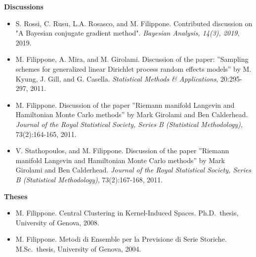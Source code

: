 \textbf{Discussions}\begin{itemize}
\item  S. Rossi, C. Rusu, L.A. Rosasco, and M. Filippone. Contributed discussion on "{A} {B}ayesian conjugate gradient method". \emph{{B}ayesian {A}nalysis, 14(3), 2019}, 2019.
\item  M. Filippone, A. Mira, and M. Girolami. Discussion of the paper: ''{S}ampling schemes for generalized linear {D}irichlet process random effects models'' by {M}. {K}yung, {J}. {G}ill, and {G}. {C}asella. \emph{Statistical Methods \& Applications}, 20:295-297, 2011.
\item  M. Filippone. Discussion of the paper ''{R}iemann manifold {L}angevin and {H}amiltonian {M}onte {C}arlo methods'' by {M}ark {G}irolami and {B}en {C}alderhead. \emph{Journal of the Royal Statistical Society, Series B (Statistical Methodology)}, 73(2):164-165, 2011.
\item  V. Stathopoulos, and M. Filippone. Discussion of the paper ''{R}iemann manifold {L}angevin and {H}amiltonian {M}onte {C}arlo methods'' by {M}ark {G}irolami and {B}en {C}alderhead. \emph{Journal of the Royal Statistical Society, Series B (Statistical Methodology)}, 73(2):167-168, 2011.
\end{itemize}

\textbf{Theses}\begin{itemize}
\item  M. Filippone. Central Clustering in Kernel-Induced Spaces. Ph.D.\ thesis, University of Genova, 2008.
\item  M. Filippone. Metodi di Ensemble per la Previsione di Serie Storiche. M.Sc.\ thesis, University of Genova, 2004.
\end{itemize}
